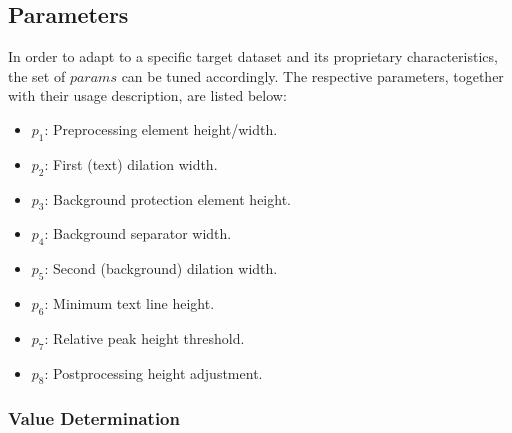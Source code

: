 \documentclass{jdmdh}
\begin{document}
\subsection{Parameters}

In order to adapt to a specific target dataset and its proprietary characteristics, the set of $params$  can be tuned accordingly. The respective parameters, together with their usage description, are listed below: \\
\begin{itemize}
    \item $p_1$: Preprocessing element height/width.
    \item $p_2$: First (text) dilation width.
    \item $p_3$: Background protection element height.
    \item $p_4$: Background separator width.
    \item $p_5$: Second (background) dilation width.
    \item $p_6$: Minimum text line height.
    \item $p_7$: Relative peak height threshold.
    \item $p_8$: Postprocessing height adjustment.
\end{itemize}
\subsubsection{Value Determination}
\end{document}
